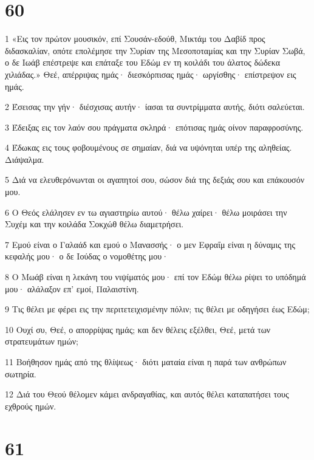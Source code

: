 \chapter{60}

\par 1 «Εις τον πρώτον μουσικόν, επί Σουσάν-εδούθ, Μικτάμ του Δαβίδ προς διδασκαλίαν, οπότε επολέμησε την Συρίαν της Μεσοποταμίας και την Συρίαν Σωβά, ο δε Ιωάβ επέστρεψε και επάταξε του Εδώμ εν τη κοιλάδι του άλατος δώδεκα χιλιάδας.» Θεέ, απέρριψας ημάς· διεσκόρπισας ημάς· ωργίσθης· επίστρεψον εις ημάς.
\par 2 Έσεισας την γήν· διέσχισας αυτήν· ίασαι τα συντρίμματα αυτής, διότι σαλεύεται.
\par 3 Έδειξας εις τον λαόν σου πράγματα σκληρά· επότισας ημάς οίνον παραφροσύνης.
\par 4 Έδωκας εις τους φοβουμένους σε σημαίαν, διά να υψόνηται υπέρ της αληθείας. Διάψαλμα.
\par 5 Διά να ελευθερόνωνται οι αγαπητοί σου, σώσον διά της δεξιάς σου και επάκουσόν μου.
\par 6 Ο Θεός ελάλησεν εν τω αγιαστηρίω αυτού· θέλω χαίρει· θέλω μοιράσει την Συχέμ και την κοιλάδα Σοκχώθ θέλω διαμετρήσει.
\par 7 Εμού είναι ο Γαλαάδ και εμού ο Μανασσής· ο μεν Εφραΐμ είναι η δύναμις της κεφαλής μου· ο δε Ιούδας ο νομοθέτης μου·
\par 8 Ο Μωάβ είναι η λεκάνη του νιψίματός μου· επί τον Εδώμ θέλω ρίψει το υπόδημά μου· αλάλαξον επ' εμοί, Παλαιστίνη.
\par 9 Τις θέλει με φέρει εις την περιτετειχισμένην πόλιν; τις θέλει με οδηγήσει έως Εδώμ;
\par 10 Ουχί συ, Θεέ, ο απορρίψας ημάς; και δεν θέλεις εξέλθει, Θεέ, μετά των στρατευμάτων ημών;
\par 11 Βοήθησον ημάς από της θλίψεως· διότι ματαία είναι η παρά των ανθρώπων σωτηρία.
\par 12 Διά του Θεού θέλομεν κάμει ανδραγαθίας, και αυτός θέλει καταπατήσει τους εχθρούς ημών.

\chapter{61}

